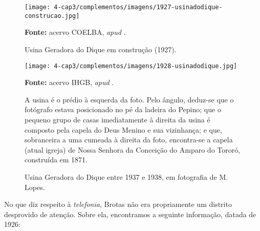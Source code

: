 \begin{figure}[!htp]
\centering
\caption{Usina Geradora do Dique em construção (1927).}
\texttt{[image: 4-cap3/complementos/imagens/1927-usinadodique-construcao.jpg]}{\par \footnotesize \textbf{Fonte:} acervo COELBA, \textit{apud} .}
\label{fig:usinadiqueconstrucao}
\end{figure}

\begin{figure}[!htp]
\centering
\caption{Usina Geradora do Dique entre 1937 e 1938, em fotografia de M. Lopes.}
\texttt{[image: 4-cap3/complementos/imagens/1928-usinadodique.jpg]}{\par \footnotesize \textbf{Fonte:} acervo IHGB, \textit{apud} . \par A usina é o prédio à esquerda da foto. Pelo ângulo, deduz-se que o fotógrafo estava posicionado no pé da ladeira do Pepino; que o pequeno grupo de casas imediatamente à direita da usina é composto pela capela do Deus Menino e sua vizinhança; e que, sobranceira a uma cumeada à direita da foto, encontra-se a capela (atual igreja) de Nossa Senhora da Conceição do Amparo do Tororó, construída em 1871.}
\label{fig:usinadique}
\end{figure}

No que diz respeito à \textit{telefonia}, Brotas não era propriamente um distrito desprovido de atenção. Sobre ela, encontramos a seguinte informação, datada de 1926:


